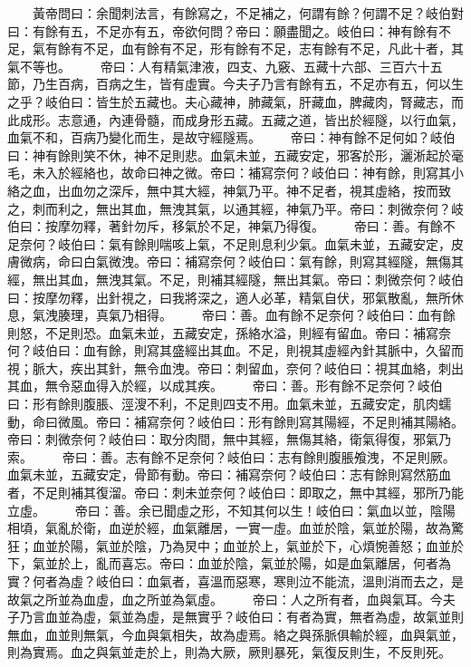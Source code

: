 　　黃帝問曰：余聞刺法言，有餘寫之，不足補之，何謂有餘？何謂不足？岐伯對曰：有餘有五，不足亦有五，帝欲何問？帝曰：願盡聞之。岐伯曰：神有餘有不足，氣有餘有不足，血有餘有不足，形有餘有不足，志有餘有不足，凡此十者，其氣不等也。
　　帝曰：人有精氣津液，四支、九竅、五藏十六部、三百六十五節，乃生百病，百病之生，皆有虛實。今夫子乃言有餘有五，不足亦有五，何以生之乎？岐伯曰：皆生於五藏也。夫心藏神，肺藏氣，肝藏血，脾藏肉，腎藏志，而此成形。志意通，內連骨髓，而成身形五藏。五藏之道，皆出於經隧，以行血氣，血氣不和，百病乃變化而生，是故守經隧焉。
　　帝曰：神有餘不足何如？岐伯曰：神有餘則笑不休，神不足則悲。血氣未並，五藏安定，邪客於形，灑淅起於毫毛，未入於經絡也，故命曰神之微。帝曰：補寫奈何？岐伯曰：神有餘，則寫其小絡之血，出血勿之深斥，無中其大經，神氣乃平。神不足者，視其虛絡，按而致之，刺而利之，無出其血，無洩其氣，以通其經，神氣乃平。帝曰：刺微奈何？岐伯曰：按摩勿釋，著針勿斥，移氣於不足，神氣乃得復。
　　帝曰：善。有餘不足奈何？岐伯曰：氣有餘則喘咳上氣，不足則息利少氣。血氣未並，五藏安定，皮膚微病，命曰白氣微洩。帝曰：補寫奈何？岐伯曰：氣有餘，則寫其經隧，無傷其經，無出其血，無洩其氣。不足，則補其經隧，無出其氣。帝曰：刺微奈何？岐伯曰：按摩勿釋，出針視之，曰我將深之，適人必革，精氣自伏，邪氣散亂，無所休息，氣洩腠理，真氣乃相得。
　　帝曰：善。血有餘不足奈何？岐伯曰：血有餘則怒，不足則恐。血氣未並，五藏安定，孫絡水溢，則經有留血。帝曰：補寫奈何？岐伯曰：血有餘，則寫其盛經出其血。不足，則視其虛經內針其脈中，久留而視；脈大，疾出其針，無令血洩。帝曰：刺留血，奈何？岐伯曰：視其血絡，刺出其血，無令惡血得入於經，以成其疾。
　　帝曰：善。形有餘不足奈何？岐伯曰：形有餘則腹脹、涇溲不利，不足則四支不用。血氣未並，五藏安定，肌肉蠕動，命曰微風。帝曰：補寫奈何？岐伯曰：形有餘則寫其陽經，不足則補其陽絡。帝曰：刺微奈何？岐伯曰：取分肉間，無中其經，無傷其絡，衛氣得復，邪氣乃索。
　　帝曰：善。志有餘不足奈何？岐伯曰：志有餘則腹脹飧洩，不足則厥。血氣未並，五藏安定，骨節有動。帝曰：補寫奈何？岐伯曰：志有餘則寫然筋血者，不足則補其復溜。帝曰：刺未並奈何？岐伯曰：即取之，無中其經，邪所乃能立虛。
　　帝曰：善。余已聞虛之形，不知其何以生！岐伯曰：氣血以並，陰陽相頃，氣亂於衛，血逆於經，血氣離居，一實一虛。血並於陰，氣並於陽，故為驚狂；血並於陽，氣並於陰，乃為炅中；血並於上，氣並於下，心煩惋善怒；血並於下，氣並於上，亂而喜忘。帝曰：血並於陰，氣並於陽，如是血氣離居，何者為實？何者為虛？岐伯曰：血氣者，喜溫而惡寒，寒則泣不能流，溫則消而去之，是故氣之所並為血虛，血之所並為氣虛。
　　帝曰：人之所有者，血與氣耳。今夫子乃言血並為虛，氣並為虛，是無實乎？岐伯曰：有者為實，無者為虛，故氣並則無血，血並則無氣，今血與氣相失，故為虛焉。絡之與孫脈俱輸於經，血與氣並，則為實焉。血之與氣並走於上，則為大厥，厥則暴死，氣復反則生，不反則死。
